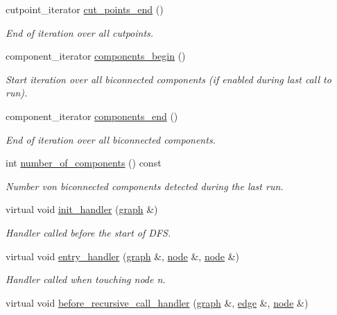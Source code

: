 \begin{DoxyCompactItemize}
cutpoint\+\_\+iterator \mbox{\hyperlink{classbiconnectivity_a78cb06c1d056b9519622a67a92e85b6e}{cut\+\_\+points\+\_\+end}} ()
\begin{DoxyCompactList}\small\item\em End of iteration over all cutpoints. \end{DoxyCompactList}\item 
component\+\_\+iterator \mbox{\hyperlink{classbiconnectivity_ac0b7253533edc3f1412f771cb35bf04a}{components\+\_\+begin}} ()
\begin{DoxyCompactList}\small\item\em Start iteration over all biconnected components (if enabled during last call to run). \end{DoxyCompactList}\item 
component\+\_\+iterator \mbox{\hyperlink{classbiconnectivity_a0bd1c70975e664174e591efd64f8dc71}{components\+\_\+end}} ()
\begin{DoxyCompactList}\small\item\em End of iteration over all biconnected components. \end{DoxyCompactList}\item 
int \mbox{\hyperlink{classbiconnectivity_ad77634a59ac6a08fae43c1c38540d5f0}{number\+\_\+of\+\_\+components}} () const
\begin{DoxyCompactList}\small\item\em Number von biconnected components detected during the last run. \end{DoxyCompactList}\item 
virtual void \mbox{\hyperlink{classbiconnectivity_a64adab869e0080e3a1f8479e70010317}{init\+\_\+handler}} (\mbox{\hyperlink{classgraph}{graph}} \&)
\begin{DoxyCompactList}\small\item\em Handler called before the start of D\+FS. \end{DoxyCompactList}\item 
virtual void \mbox{\hyperlink{classbiconnectivity_acb402f2d144f84429b3cd009121245b0}{entry\+\_\+handler}} (\mbox{\hyperlink{classgraph}{graph}} \&, \mbox{\hyperlink{classnode}{node}} \&, \mbox{\hyperlink{classnode}{node}} \&)
\begin{DoxyCompactList}\small\item\em Handler called when touching node {\itshape n}. \end{DoxyCompactList}\item 
virtual void \mbox{\hyperlink{classbiconnectivity_a19261e91eef3f7d6b8586fa1eae9f277}{before\+\_\+recursive\+\_\+call\+\_\+handler}} (\mbox{\hyperlink{classgraph}{graph}} \&, \mbox{\hyperlink{classedge}{edge}} \&, \mbox{\hyperlink{classnode}{node}} \&)

\end{DoxyCompactItemize}
